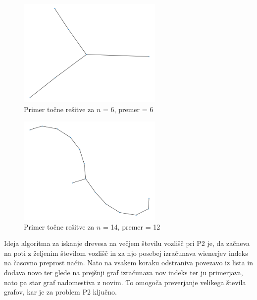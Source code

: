 \documentclass[a4paper, 12 pt]{article}
\begin{document}

\begin{figure}[H]
\centering
  \includegraphics[width=7cm]{drevo6diam4.png}
  \caption{Primer točne rešitve za $n$ = 6, premer = 6}
  \label{fig:graf1} 
\end{figure}

\begin{figure}[H]
\centering
  \includegraphics[width=7cm]{drevo14diam12.png}
  \caption{Primer točne rešitve za $n$ = 14, premer = 12}
  \label{fig:graf1}
\end{figure}

\vspace{1cm}

Ideja algoritma za iskanje drevesa na večjem številu vozlišč pri P2 je, da začneva na poti z željenim številom vozlišč in za njo posebej izračunava wienerjev indeks na časovno preprost način. Nato na vsakem koraku odstraniva povezavo iz lista in dodava novo ter glede na prejšnji graf izračunava nov indeks ter ju primerjava, nato pa star graf nadomestiva z novim. To omogoča preverjanje velikega števila grafov, kar je za problem P2 ključno.
\end{document}
